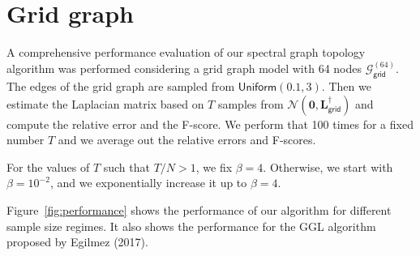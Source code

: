 \documentclass{article}
\begin{document}
\section{Grid graph}
A comprehensive performance evaluation of our spectral graph topology algorithm was
performed considering a grid graph model with 64 nodes $\mathcal{G}^{(64)}_{\mathsf{grid}}$.
The edges of the grid graph are sampled from $\mathsf{Uniform}(0.1, 3)$.
Then we estimate the Laplacian matrix based on $T$ samples from $\mathcal{N}(\mathbf{0}, \mathbf{L}_{\mathsf{grid}}^{\dagger})$
and compute the relative error and the F-score. We perform that 100 times for a fixed number $T$ and we average out the relative errors
and F-scores.

For the values of $T$ such that $T / N > 1$, we fix $\beta = 4$. Otherwise, we start with $\beta = 10^{-2}$, and we exponentially
increase it up to $\beta = 4$.

Figure~\ref{fig:performance} shows the performance of our algorithm for different sample size regimes.
It also shows the performance for the \textsf{GGL} algorithm proposed by Egilmez (2017).
\end{document}
